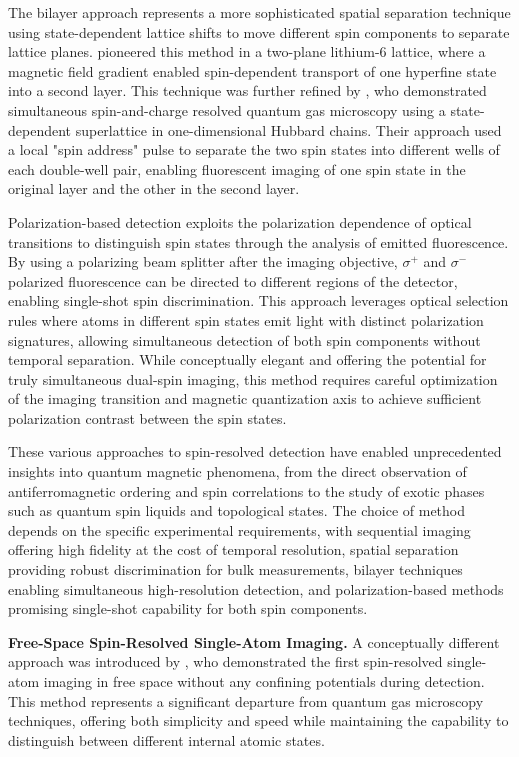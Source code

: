 The bilayer approach represents a more sophisticated spatial separation technique using state-dependent lattice shifts to move different spin components to separate lattice planes. \cite{preiss_quantum_2015} pioneered this method in a two-plane lithium-6 lattice, where a magnetic field gradient enabled spin-dependent transport of one hyperfine state into a second layer. This technique was further refined by \cite{boll_spin-_2016}, who demonstrated simultaneous spin-and-charge resolved quantum gas microscopy using a state-dependent superlattice in one-dimensional Hubbard chains. Their approach used a local "spin address" pulse to separate the two spin states into different wells of each double-well pair, enabling fluorescent imaging of one spin state in the original layer and the other in the second layer.

Polarization-based detection exploits the polarization dependence of optical transitions to distinguish spin states through the analysis of emitted fluorescence. By using a polarizing beam splitter after the imaging objective, $\sigma^+$ and $\sigma^-$ polarized fluorescence can be directed to different regions of the detector, enabling single-shot spin discrimination. This approach leverages optical selection rules where atoms in different spin states emit light with distinct polarization signatures, allowing simultaneous detection of both spin components without temporal separation. While conceptually elegant and offering the potential for truly simultaneous dual-spin imaging, this method requires careful optimization of the imaging transition and magnetic quantization axis to achieve sufficient polarization contrast between the spin states.

These various approaches to spin-resolved detection have enabled unprecedented insights into quantum magnetic phenomena, from the direct observation of antiferromagnetic ordering and spin correlations to the study of exotic phases such as quantum spin liquids and topological states. The choice of method depends on the specific experimental requirements, with sequential imaging offering high fidelity at the cost of temporal resolution, spatial separation providing robust discrimination for bulk measurements, bilayer techniques enabling simultaneous high-resolution detection, and polarization-based methods promising single-shot capability for both spin components.

\textbf{Free-Space Spin-Resolved Single-Atom Imaging.} A conceptually different approach was introduced by \cite{bergschneider_spin-resolved_2018}, who demonstrated the first spin-resolved single-atom imaging in free space without any confining potentials during detection. This method represents a significant departure from quantum gas microscopy techniques, offering both simplicity and speed while maintaining the capability to distinguish between different internal atomic states.

